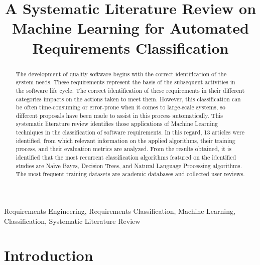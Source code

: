 \documentclass[conference]{IEEEtran}
\begin{document}
\title{A Systematic Literature Review on Machine Learning for Automated Requirements Classification}

\author{
}

\maketitle

\begin{abstract}
The development of quality software begins with the correct identification of the system needs. These requirements represent the basis of the subsequent activities in the software life cycle. The correct identification of these requirements in their different categories impacts on the actions taken to meet them. However, this classification can be often time-consuming or error-prone when it comes to large-scale systems, so different proposals have been made to assist in this process automatically. This systematic literature review identifies those applications of Machine Learning techniques in the classification of software requirements. In this regard, 13 articles were identified, from which relevant information on the applied algorithms, their training process, and their evaluation metrics are analyzed. From the results obtained, it is identified that the most recurrent classification algorithms featured on the identified studies are Naïve Bayes, Decision Trees, and Natural Language Processing algorithms. The most frequent training datasets are academic databases and collected user reviews.
\end{abstract}

\begin{IEEEkeywords}
Requirements Engineering, Requirements Classification, Machine Learning, Classification, Systematic Literature Review
\end{IEEEkeywords}

\section{Introduction}
\label{introduction}
\end{document}
